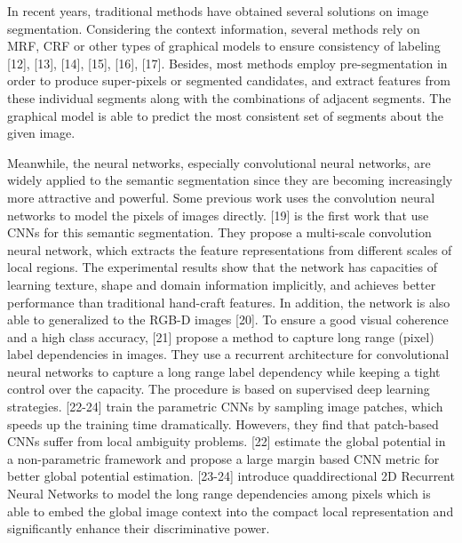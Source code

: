 \documentclass[10.5pt,compsoc]{TsT}
\theoremstyle{mystyle}
\begin{document}
{In recent years, traditional methods have obtained several solutions on image segmentation. Considering the context information, several methods rely on MRF, CRF or other types of graphical models to ensure consistency of labeling [12], [13], [14], [15], [16], [17]. Besides, most methods employ pre-segmentation in order to produce super-pixels or segmented candidates, and extract features from these individual segments along with the combinations of adjacent segments. The graphical model is able to predict the most consistent set of segments about the given image.

Meanwhile, the neural networks, especially convolutional neural networks, are widely applied to the semantic segmentation since they are becoming increasingly more attractive and powerful. Some previous work uses the convolution neural networks to model the pixels of images directly. [19] is the first work that use CNNs for this semantic segmentation. They propose a multi-scale convolution neural network, which extracts the feature representations from different scales of local regions. The experimental results show that the network has capacities of learning texture, shape and domain information implicitly, and achieves better performance than traditional hand-craft features. In addition, the network is also able to generalized to the RGB-D images [20]. To ensure a good visual coherence and a high class accuracy, [21] propose a method to capture long range (pixel) label dependencies in images. They use a recurrent architecture for convolutional neural networks to capture a long range label dependency while keeping a tight control over the capacity. The procedure is based on supervised deep learning strategies. [22-24] train the parametric CNNs by sampling image patches, which speeds up the training time dramatically. Howevers, they find that patch-based CNNs suffer from local ambiguity problems. [22] estimate the global potential in a non-parametric framework and propose a large margin based CNN metric for better global potential estimation. [23-24] introduce quaddirectional 2D Recurrent Neural Networks to model the long range dependencies among pixels which is able to embed the global image context into the compact local representation and significantly enhance their discriminative power.

}
\end{document}
